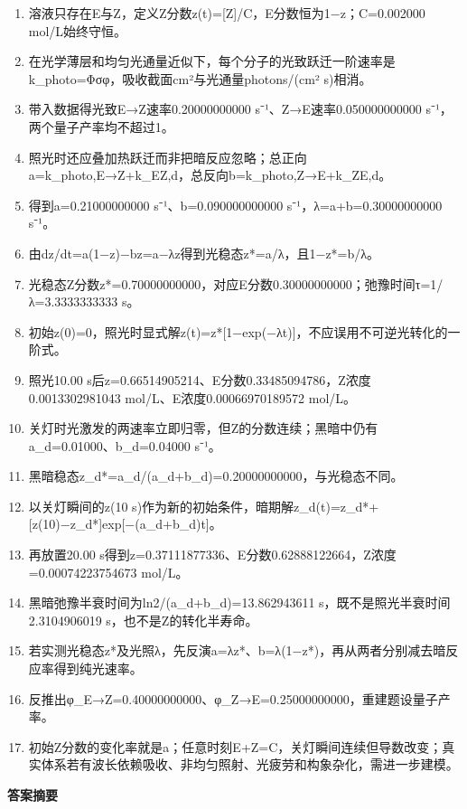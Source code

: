 \documentclass[UTF8,11pt,a4paper]{ctexart}
\begin{document}
\begin{enumerate}
\item 溶液只存在E与Z，定义Z分数z(t)=[Z]/C，E分数恒为1−z；C=0.002000 mol/L始终守恒。
\item 在光学薄层和均匀光通量近似下，每个分子的光致跃迁一阶速率是k\_photo=Φσφ，吸收截面cm²与光通量photons/(cm² s)相消。
\item 带入数据得光致E→Z速率0.20000000000 s⁻¹、Z→E速率0.050000000000 s⁻¹，两个量子产率均不超过1。
\item 照光时还应叠加热跃迁而非把暗反应忽略；总正向a=k\_photo,E→Z+k\_EZ,d，总反向b=k\_photo,Z→E+k\_ZE,d。
\item 得到a=0.21000000000 s⁻¹、b=0.090000000000 s⁻¹，λ=a+b=0.30000000000 s⁻¹。
\item 由dz/dt=a(1−z)−bz=a−λz得到光稳态z*=a/λ，且1−z*=b/λ。
\item 光稳态Z分数z*=0.70000000000，对应E分数0.30000000000；弛豫时间τ=1/λ=3.3333333333 s。
\item 初始z(0)=0，照光时显式解z(t)=z*[1−exp(−λt)]，不应误用不可逆光转化的一阶式。
\item 照光10.00 s后z=0.66514905214、E分数0.33485094786，Z浓度0.0013302981043 mol/L、E浓度0.00066970189572 mol/L。
\item 关灯时光激发的两速率立即归零，但Z的分数连续；黑暗中仍有a\_d=0.01000、b\_d=0.04000 s⁻¹。
\item 黑暗稳态z\_d*=a\_d/(a\_d+b\_d)=0.20000000000，与光稳态不同。
\item 以关灯瞬间的z(10 s)作为新的初始条件，暗期解z\_d(t)=z\_d*+[z(10)−z\_d*]exp[−(a\_d+b\_d)t]。
\item 再放置20.00 s得到z=0.37111877336、E分数0.62888122664，Z浓度=0.00074223754673 mol/L。
\item 黑暗弛豫半衰时间为ln2/(a\_d+b\_d)=13.862943611 s，既不是照光半衰时间2.3104906019 s，也不是Z的转化半寿命。
\item 若实测光稳态z*及光照λ，先反演a=λz*、b=λ(1−z*)，再从两者分别减去暗反应率得到纯光速率。
\item 反推出φ\_E→Z=0.40000000000、φ\_Z→E=0.25000000000，重建题设量子产率。
\item 初始Z分数的变化率就是a；任意时刻E+Z=C，关灯瞬间连续但导数改变；真实体系若有波长依赖吸收、非均匀照射、光疲劳和构象杂化，需进一步建模。
\end{enumerate}
\noindent\textbf{答案摘要}\par
\end{document}
